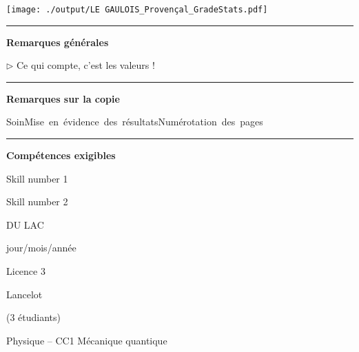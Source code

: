 \documentclass[12pt, a4paper]{article}
\begin{document}
\begin{center}
\texttt{[image: ./output/LE GAULOIS\_Provençal\_GradeStats.pdf]}\end{center}


\noindent\rule{\linewidth}{.7pt}\begin{center}{\large\bf Remarques générales}\end{center}

$\triangleright$\xspace Ce qui compte, c’est les valeurs !


\noindent\rule{\linewidth}{.7pt}\begin{center}{\large\bf Remarques sur la copie}\end{center}

\begin{center}
\noindent \mbox{Soin\xspace\xspace\color{DarkRed}\faFrownO\color{black}}\hfill \mbox{Mise en évidence des résultats\xspace\xspace\color{DarkRed}\faFrownO\color{black}}\hfill \mbox{Numérotation des pages\xspace\xspace\color{DarkGreen}\faSmileO\color{black}}\hfill 
\end{center}


\noindent\rule{\linewidth}{.7pt}\begin{center}{\large\bf Compétences exigibles}\end{center}

\begin{minipage}[c]{0.4\linewidth}\centering
Skill number 1\xspace\xspace\color{DarkRed}\faFrownO\color{black}
\end{minipage}\hfill
\begin{minipage}[c]{0.4\linewidth}\centering
Skill number 2\xspace\xspace\color{DarkRed}\faFrownO\color{black}
\end{minipage}
\newpage
\pagestyle{empty}
\noindent\begin{minipage}[c]{0.31\linewidth}\noindent DU LAC\end{minipage}\hfill
\begin{minipage}[c]{0.31\linewidth}\centering jour/mois/année \end{minipage}\hfill
\begin{minipage}[c]{0.31\linewidth}\hfill Licence 3 \end{minipage}\hfill

\noindent\begin{minipage}[c]{0.31\linewidth}\noindent Lancelot\end{minipage}\hfill
\begin{minipage}[c]{0.31\linewidth}\hfill(3 étudiants)\end{minipage}
\begin{center} Physique -- CC1 Mécanique quantique\bigskip

{\Large\bf {}}\end{center}
\end{document}
